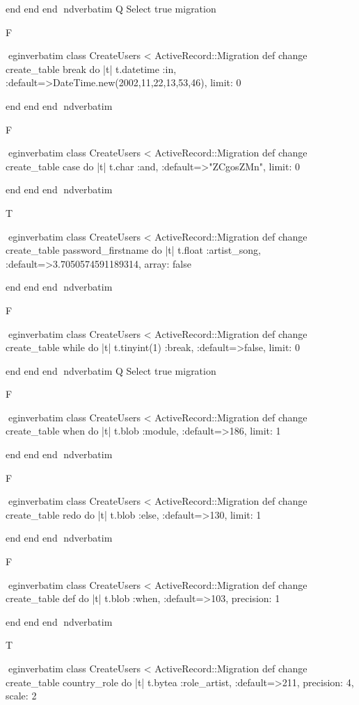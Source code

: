     end 
  end 
end
nd{verbatim}
Q
 Select true migration

F

egin{verbatim}
 class CreateUsers < ActiveRecord::Migration 
  def change 
    create_table break do |t| 
      t.datetime :in, :default=>DateTime.new(2002,11,22,13,53,46), limit: 0
    
    end 
  end 
end
nd{verbatim}

F

egin{verbatim}
 class CreateUsers < ActiveRecord::Migration 
  def change 
    create_table case do |t| 
      t.char :and, :default=>"ZCgosZMn", limit: 0
    
    end 
  end 
end
nd{verbatim}

T

egin{verbatim}
 class CreateUsers < ActiveRecord::Migration 
  def change 
    create_table password_firstname do |t| 
      t.float :artist_song, :default=>3.7050574591189314, array: false
    
    end 
  end 
end
nd{verbatim}

F

egin{verbatim}
 class CreateUsers < ActiveRecord::Migration 
  def change 
    create_table while do |t| 
      t.tinyint(1) :break, :default=>false, limit: 0
    
    end 
  end 
end
nd{verbatim}
Q
 Select true migration

F

egin{verbatim}
 class CreateUsers < ActiveRecord::Migration 
  def change 
    create_table when do |t| 
      t.blob :module, :default=>186, limit: 1
    
    end 
  end 
end
nd{verbatim}

F

egin{verbatim}
 class CreateUsers < ActiveRecord::Migration 
  def change 
    create_table redo do |t| 
      t.blob :else, :default=>130, limit: 1
    
    end 
  end 
end
nd{verbatim}

F

egin{verbatim}
 class CreateUsers < ActiveRecord::Migration 
  def change 
    create_table def do |t| 
      t.blob :when, :default=>103, precision: 1
    
    end 
  end 
end
nd{verbatim}

T

egin{verbatim}
 class CreateUsers < ActiveRecord::Migration 
  def change 
    create_table country_role do |t| 
      t.bytea :role_artist, :default=>211, precision: 4, scale: 2
    
